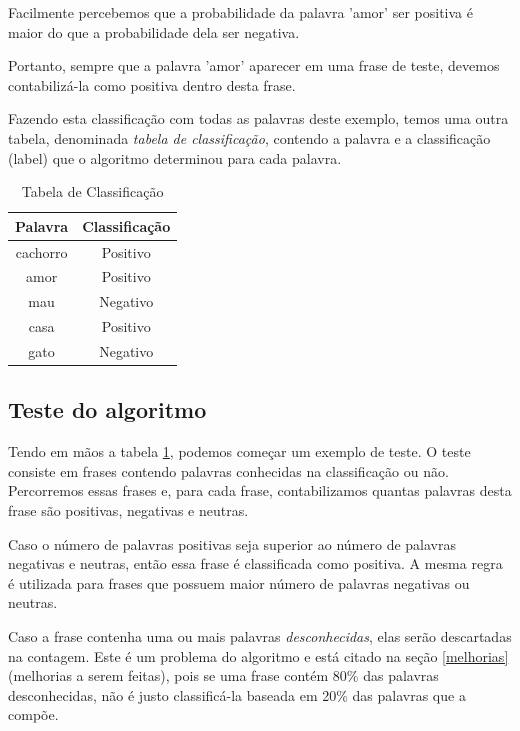 \documentclass[
article,			%
12pt,				%
a4paper,			%
english,			%
brazil,				%
sumario=tradicional,
twoside
]{abntex2}
\begin{document}
	Facilmente percebemos que a probabilidade da palavra 'amor' ser positiva é maior do que a probabilidade dela ser negativa. 
	
	Portanto, sempre que a palavra 'amor' aparecer em uma frase de teste, devemos contabilizá-la como positiva dentro desta frase.
	
	Fazendo esta classificação com todas as palavras deste exemplo, temos uma outra tabela, denominada \emph{tabela de classificação}, contendo a palavra e a classificação (label) que o algoritmo determinou para cada palavra.
	
	\begin{table}[!h]
		\caption{Tabela de Classificação}
		\label{tab: labels}
		\centering
		
		\begin{tabular}{|c|c|} \hline
			\textbf{Palavra} & \textbf{Classificação} \\
			\hline
			cachorro & Positivo \\
			amor & Positivo \\
			mau & Negativo \\
			casa & Positivo \\
			gato & Negativo \\
			\hline
		\end{tabular}
		
	\end{table}
	
	\subsection{Teste do algoritmo}
	Tendo em mãos a tabela \ref{tab: labels}, podemos começar um exemplo de teste. 
	O teste consiste em frases contendo palavras conhecidas na classificação ou não.
	Percorremos essas frases e, para cada frase, contabilizamos quantas palavras desta frase são positivas, negativas e neutras. 
	
	Caso o número de palavras positivas seja superior ao número de palavras negativas e neutras, então essa frase é classificada como positiva. A mesma regra é utilizada para frases que possuem maior número de palavras negativas ou neutras.
	
	Caso a frase contenha uma ou mais palavras \emph{desconhecidas}, elas serão descartadas na contagem. Este é um problema do algoritmo e está citado na seção \ref{melhorias} (melhorias a serem feitas), pois se uma frase contém 80\% das palavras desconhecidas, não é justo classificá-la baseada em 20\% das palavras que a compõe.
	
\end{document}
